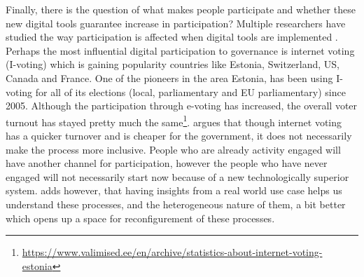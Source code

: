 Finally, there is the question of what makes people participate and whether these new digital tools guarantee increase in participation? Multiple researchers have studied the way participation is affected when digital tools are implemented \citep{conroy_e-participation_2006,macintosh_e-democracy_2008,kim_e-participation_2012,macintosh_characterizing_2004,kitsing_online_2011}. Perhaps the most influential digital participation to governance is internet voting (I-voting) which is gaining popularity countries like Estonia, Switzerland, US, Canada and France. One of the pioneers in the area Estonia, has been using I-voting for all of its elections (local, parliamentary and EU parliamentary) since 2005. Although the participation through e-voting has increased, the overall voter turnout has stayed pretty much the same\footnote{\url{https://www.valimised.ee/en/archive/statistics-about-internet-voting-estonia}}. \citet{kitsing_online_2011} argues that though internet voting has a quicker turnover and is cheaper for the government, it does not necessarily make the process more inclusive. People who are already activity engaged will have another channel for participation, however the people who have never engaged will not necessarily start now because of a new technologically superior system. \citet{kitsing_online_2011} adds however, that having insights from a real world use case helps us understand these processes, and the heterogeneous nature of them, a bit better which opens up a space for reconfigurement of these processes.


